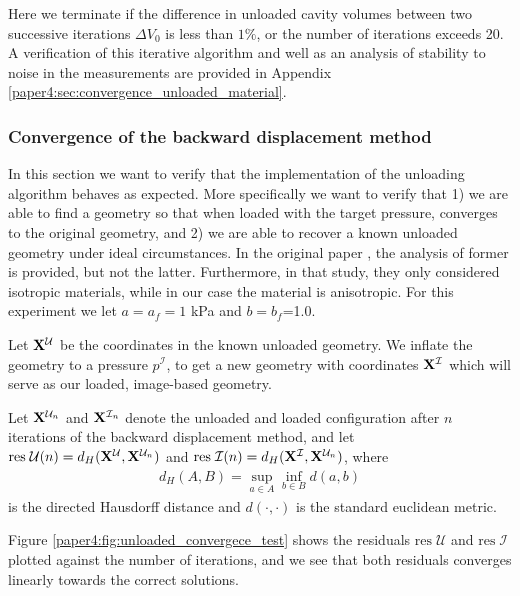 Here we terminate if the difference in unloaded cavity volumes between
two successive iterations $\Delta V_0$ is less than $1 \%$, or the
number of iterations exceeds 20. A verification of this iterative
algorithm and well as an analysis of stability to noise in the
measurements are provided in Appendix
\ref{paper4:sec:convergence_unloaded_material}.  



\subsubsection{Convergence of the backward displacement method}
\label{paper4:sec:convergence_unloading}
In this section we want to verify that the implementation of the
unloading algorithm behaves as expected. More specifically we want to
verify that 1) we are able to find a geometry so that when loaded with
the target pressure, converges to the original geometry, and 2) we are
able to recover a known unloaded geometry under ideal
circumstances. In the original paper \cite{bols2013computational}, the
analysis of former is provided, but not the latter. Furthermore, in
that study, they only considered isotropic materials, while in our
case the material is anisotropic. For this experiment we let $a=a_f =
1$ kPa and $b=b_f$=1.0. 

Let $\mathbf{X}^{\mathcal{U}}$ be the coordinates in the known unloaded
geometry. We inflate the geometry to a pressure $p^{\mathcal{I}}$,
to get a new geometry with coordinates $\mathbf{X}^{\mathcal{I}}$ which
will serve as our loaded, image-based geometry.

Let $\mathbf{X}^{\mathcal{U}_n}$ and $\mathbf{X}^{\mathcal{I}_n}$ denote the
unloaded and loaded configuration after $n$ iterations of the backward
displacement method, and let $\mathrm{res}\;\mathcal{U} (n) =
d_H(\mathbf{X}^{\mathcal{U}}, \mathbf{X}^{\mathcal{U}_n}) $ and $\mathrm{res}\;\mathcal{I} (n) =
d_H(\mathbf{X}^{\mathcal{I}}, \mathbf{X}^{\mathcal{U}_n}) $, where
\begin{align}
  d_H(A, B) = \sup_{a \in A} \inf_{b \in B} d(a,b) 
\end{align}
is the directed Hausdorff distance \cite{huttenlocher1993comparing}
and $d(\cdot, \cdot)$ is the standard euclidean metric.

Figure \ref{paper4:fig:unloaded_convergece_test} shows the residuals $\mathrm{res}\;\mathcal{U}$
and $\mathrm{res}\;\mathcal{I}$ plotted against the number of
iterations, and we see that both residuals converges linearly towards
the correct solutions. 



